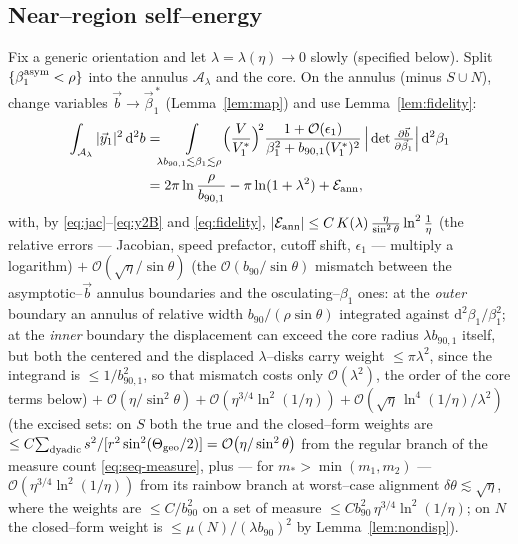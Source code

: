 \documentclass[11pt]{article}
\newcommand{\dd}{\mathrm{d}}
\newcommand{\bv}{\vec b}
\newcommand{\bnt}{b_{90}}
\newcommand{\order}[1]{\mathcal O\!\left(#1\right)}
\begin{document}
\subsection{Near--region self--energy}
\label{sec:near-assembly}
Fix a generic orientation and let $\lambda=\lambda(\eta)\to0$ slowly (specified below). Split
$\{\beta_1^{\rm asym}<\rho\}$ into the annulus $\mathcal A_\lambda$ and the core. On the annulus
(minus $S\cup N$), change variables $\bv\to\vec\beta_1^{\,*}$ (Lemma~\ref{lem:map}) and use
Lemma~\ref{lem:fidelity}:
\begin{equation}
\begin{split}
  \int_{\mathcal A_\lambda}|\vec y_1|^2\,\dd^2b
  &=\!\!\int\limits_{\lambda b_{90,1}\lesssim\beta_1\lesssim\rho}\!\!
  \Big(\frac{V}{V_1^*}\Big)^{\!2}
  \frac{1+\order{\epsilon_1}}{\beta_1^2+b_{90,1}(V_1^*)^2}\,
   \Big|\det\tfrac{\partial\bv}{\partial\vec\beta_1}\Big|\,\dd^2\beta_1\\
  &=2\pi\ln\frac{\rho}{b_{90,1}}-\pi\ln(1+\lambda^2)+\mathcal E_{\rm ann},
\end{split}
\end{equation}
with, by \eqref{eq:jac}--\eqref{eq:y2B} and \eqref{eq:fidelity},
$|\mathcal E_{\rm ann}|\le C\,K(\lambda)\,\frac{\eta}{\sin^2\theta}\ln^2\frac1\eta$ (the relative
errors --- Jacobian, speed prefactor, cutoff shift, $\epsilon_1$ --- multiply a logarithm)
$+\;\order{\sqrt\eta/\sin\theta}$ (the
$\order{\bnt/\sin\theta}$ mismatch between the asymptotic--$\bv$ annulus boundaries and the
osculating--$\beta_1$ ones: at the \emph{outer} boundary an annulus of relative width
$\bnt/(\rho\sin\theta)$ integrated against $\dd^2\beta_1/\beta_1^2$; at the \emph{inner} boundary
the displacement can exceed the core radius $\lambda b_{90,1}$ itself, but both the centered and
the displaced $\lambda$--disks carry weight $\le\pi\lambda^2$, since the integrand is
$\le1/b_{90,1}^2$, so that mismatch costs only $\order{\lambda^2}$, the order of the core terms
below)
$+\;\order{\eta/\sin^2\theta}+\order{\eta^{3/4}\ln^2(1/\eta)}+\order{\sqrt\eta\,\ln^4(1/\eta)/\lambda^2}$
(the excised sets: on $S$ both the true and the closed--form weights are
$\le C\!\sum_{\rm dyadic}s^2/[r^2\sin^2(\Theta_{\rm geo}/2)]=\order{\eta/\sin^2\theta}$ from the
regular branch of the measure count \eqref{eq:seq-measure}, plus --- for $m_*>\min(m_1,m_2)$ ---
$\order{\eta^{3/4}\ln^2(1/\eta)}$ from its rainbow branch at worst--case alignment
$\delta\theta\lesssim\sqrt\eta$, where the weights are $\le C/b_{90}^2$ on a set of measure
$\le C b_{90}^2\,\eta^{3/4}\ln^2(1/\eta)$; on $N$ the
closed--form weight is $\le\mu(N)/(\lambda b_{90})^2$ by Lemma~\ref{lem:nondisp}).
\end{document}
